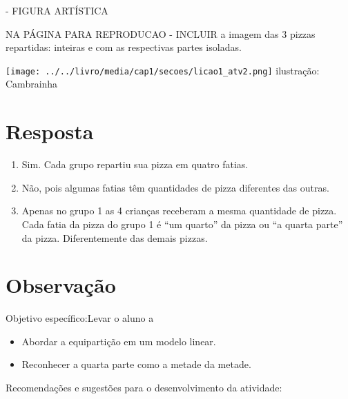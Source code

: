 \documentclass{book}
\begin{document}
  \begin{imagem*}[breakable]{}{}      - FIGURA ARTÍSTICA
    \begin{nota*}[breakable]{}{}       NA PÁGINA PARA REPRODUCAO - INCLUIR a imagem das 3 pizzas repartidas: inteiras e com as respectivas partes isoladas.
    \end{nota*}

        \texttt{[image: ../../livro/media/cap1/secoes/licao1\_atv2.png]}
    ilustração: Cambrainha

  \end{imagem*}



\section{Resposta}
\begin{enumerate} [\quad I)] %
    \item       Sim. Cada grupo repartiu sua pizza em quatro fatias.
    \item       Não, pois algumas fatias têm quantidades de pizza diferentes das outras.
    \item       Apenas no grupo 1 as 4 crianças receberam a mesma quantidade de pizza. Cada fatia da pizza do grupo 1 é       ``um quarto''       da pizza ou       ``a quarta parte''       da pizza. Diferentemente das demais pizzas.
\end{enumerate} %




\section{Observação}
  Objetivo específico:Levar o aluno a
\begin{itemize} %
    \item       Abordar a equipartição em um modelo linear.
    \item       Reconhecer a quarta parte como a metade da metade.
\end{itemize} %


  Recomendações e sugestões para o desenvolvimento da atividade:
\end{document}
